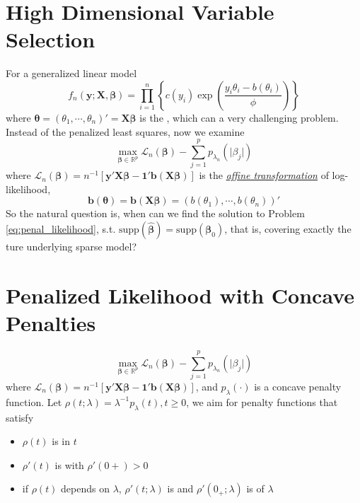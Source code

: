 \documentclass[twoside]{article}
\begin{document}
\section{High Dimensional Variable Selection}
For a generalized linear model 
$$
f_n(\mathbf{y};\mathbf{X},\boldsymbol{\beta}) = \prod_{i=1}^n \left\{ c(y_i)\exp\left( \frac{y_i\theta_i-b(\theta_i)}{\phi} \right) \right\}
$$
where $\boldsymbol{\theta}=(\theta_1,\cdots,\theta_n)' = \mathbf{X}\boldsymbol{\beta}$ is the , which can a very challenging problem. Instead of the penalized least squares, now we examine 
\begin{equation}\label{eq:penal_likelihood}
    \max_{\boldsymbol{\beta}\in\mathbb{R}^p}\mathcal{L}_n(\boldsymbol{\beta}) -\sum^p_{j=1}p_{\lambda_n}\left( \lvert \beta_j \rvert \right)
\end{equation}
where $\mathcal{L}_n(\boldsymbol{\beta}) = n^{-1} \left[ \mathbf{y}'\mathbf{X}\boldsymbol{\beta} - \mathbf{1}'\mathbf{b}(\mathbf{X}\boldsymbol{\beta}) \right]$ is the \textit{\underline{affine transformation}} of log-likelihood, $$ \mathbf{b}(\boldsymbol{\theta})= \mathbf{b}(\mathbf{X}\boldsymbol{\beta}) = \left( b(\theta_1),\cdots,b(\theta_n) \right)'$$
So the natural question is, when can we find the solution to Problem \ref{eq:penal_likelihood}, s.t. $\mathrm{supp}(\hat{\boldsymbol{\beta}}) = \mathrm{supp}(\boldsymbol{\beta}_0)$, that is, covering exactly the ture underlying sparse model?

\section{Penalized Likelihood with Concave Penalties}
$$
    \max_{\boldsymbol{\beta}\in\mathbb{R}^p}\mathcal{L}_n(\boldsymbol{\beta}) -\sum^p_{j=1}p_{\lambda_n}\left( \lvert \beta_j \rvert \right)
$$
where $\mathcal{L}_n(\boldsymbol{\beta}) = n^{-1} \left[ \mathbf{y}'\mathbf{X}\boldsymbol{\beta} - \mathbf{1}'\mathbf{b}(\mathbf{X}\boldsymbol{\beta}) \right]$, and $p_{\lambda}(\cdot)$ is a concave penalty function. Let $\rho(t;\lambda)=\lambda^{-1}p_{\lambda}(t),t\geq 0$, we aim for penalty functions that satisfy
\begin{itemize}
    \item $\rho(t)$ is  in $t$
    \item $\rho'(t)$ is  with $\rho'(0+)>0$
    \item if $\rho(t)$ depends on $\lambda$, $\rho'(t;\lambda)$ is  and $\rho'(0_+;\lambda)$ is  of $\lambda$
\end{itemize}
\end{document}
